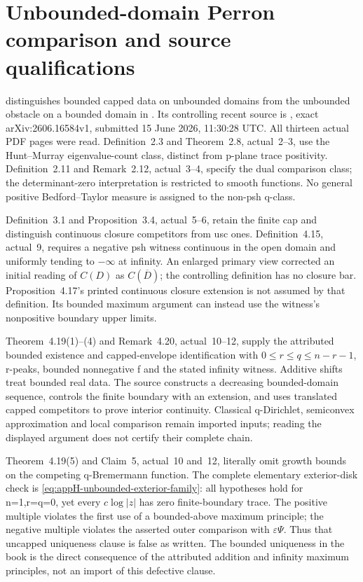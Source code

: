 \section{Unbounded-domain Perron comparison and source qualifications}
\label{sec:provenance-unbounded-domain-comparison}

 distinguishes bounded
capped data on unbounded domains from the unbounded obstacle on a
bounded domain in . Its controlling
recent source is \cite{Pawlaschyk26UnboundedPerronV1}, exact
arXiv:2606.16584v1, submitted 15 June 2026, 11:30:28 UTC.
All thirteen actual PDF pages were read. Definition~2.3 and
Theorem~2.8, actual~2--3, use the Hunt--Murray eigenvalue-count
class, distinct from p-plane trace positivity. Definition~2.11
and Remark~2.12, actual~3--4, specify the dual comparison class;
the determinant-zero interpretation is restricted to smooth functions.
No general positive Bedford--Taylor measure is assigned to the
non-psh q-class.

Definition~3.1 and Proposition~3.4, actual~5--6, retain the finite cap
and distinguish continuous closure competitors from usc ones.
Definition~4.15, actual~9, requires a negative psh witness continuous
in the open domain and uniformly tending to \(-\infty\) at infinity.
An enlarged primary view corrected an initial reading of \(C(D)\)
as \(C(\overline D)\); the controlling definition has no closure bar.
Proposition~4.17's printed continuous closure extension is not assumed
by that definition. Its bounded maximum argument can instead use the
witness's nonpositive boundary upper limits.

Theorem~4.19(1)--(4) and Remark~4.20, actual~10--12, supply the
attributed bounded existence and capped-envelope identification with
\(0\leq r\leq q\leq n-r-1\), r-peaks, bounded nonnegative f and
the stated infinity witness. Additive shifts treat bounded real data.
The source constructs a decreasing bounded-domain sequence, controls
the finite boundary with an extension, and uses translated capped
competitors to prove interior continuity. Classical q-Dirichlet,
semiconvex approximation and local comparison remain imported inputs;
reading the displayed argument does not certify their complete chain.

Theorem~4.19(5) and Claim~5, actual~10 and~12, literally omit growth
bounds on the competing q-Bremermann function. The complete elementary
exterior-disk check is \eqref{eq:appH-unbounded-exterior-family}:
all hypotheses hold for n=1,r=q=0, yet every \(c\log|z|\) has zero
finite-boundary trace. The positive multiple violates the first use
of a bounded-above maximum principle; the negative multiple violates
the asserted outer comparison with \(\varepsilon\Psi\). Thus that
uncapped uniqueness clause is false as written. The bounded uniqueness
in the book is the direct consequence of the attributed addition and
infinity maximum principles, not an import of this defective clause.

